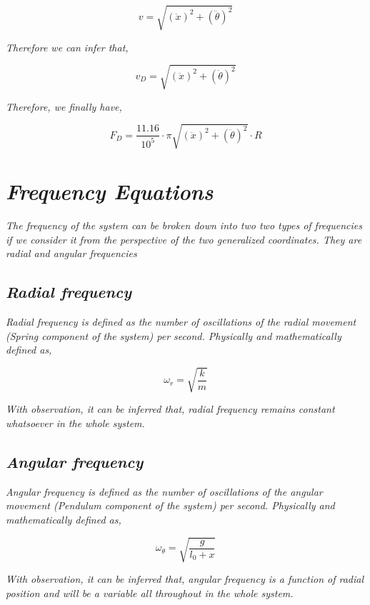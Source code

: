         $$v = \sqrt{(\ddot{x})^2 + (\ddot{\theta})^2}$$
        
    \textit{Therefore we can infer that,}
        
        $$v_D = \sqrt{(\ddot{x})^2 + (\ddot{\theta})^2}$$
            
    \textit{Therefore, we finally have,}
            
        $$F_D = \frac{11.16}{10^{5}}\cdot\pi\sqrt{(\ddot{x})^2 + (\ddot{\theta})^2}\cdot R$$
            
\section{\textit{Frequency Equations}}
            
    \textit{The frequency of the system can be broken down into two two types of frequencies if we consider it from the perspective of the two generalized coordinates. They are radial and angular frequencies}
            
    \subsection{\textit{Radial frequency}}
                
        \textit{Radial frequency is defined as the number of oscillations of the radial movement (Spring component of the system) per second. Physically and mathematically defined as,}
                
            $$\omega_r = \sqrt{\frac{k}{m}}$$
                
        \textit{With observation, it can be inferred that, radial frequency remains constant whatsoever in the whole system.}
            
    \subsection{\textit{Angular frequency}}
                
        \textit{Angular frequency is defined as the number of oscillations of the angular movement (Pendulum component of the system) per second. Physically and mathematically defined as,}
                
            $$\omega_\theta = \sqrt{\frac{g}{l_0 + x}}$$
                
        \textit{With observation, it can be inferred that, angular frequency is a function of radial position and will be a variable all throughout in the whole system.}
                
